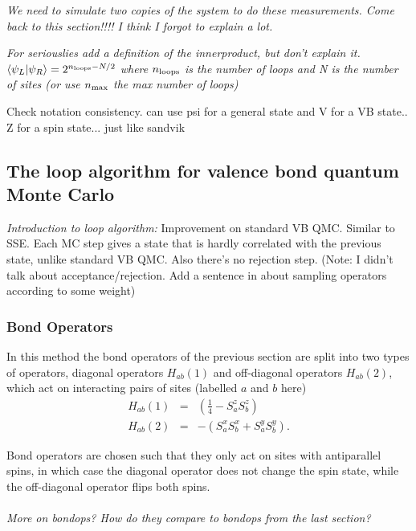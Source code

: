 \documentclass[prb,aps,twocolumn,floatfix,amsmath,amssymb,superscriptaddress,tightenlines]{revtex4}
\begin{document}
{\it We need to simulate two copies of the system to do these measurements.  
Come back to this section!!!!  I think I forgot to explain a lot. }

{\it For seriouslies add a definition of the innerproduct, but don't explain it.  
$\langle \psi_L \rvert \psi_R \rangle = 2^{n_{\rm loops} - N/2}$ where $n_{\rm loops}$ is the number
of loops and N is the number of sites  (or use $n_{\rm max}$ the max number of loops)

Check notation consistency.  can use psi for a general state and V for a VB state.. Z for a spin state... just like sandvik
}

\subsection{The loop algorithm for valence bond quantum Monte Carlo}

{\it Introduction to loop algorithm:}
Improvement on standard VB QMC.  Similar to SSE.  Each MC step gives a state that is hardly correlated with the previous state, unlike standard VB QMC.  Also there's no rejection step.  (Note: I didn't talk about acceptance/rejection.  Add a sentence in about sampling operators according to some weight)

\subsubsection{Bond Operators}

In this method the bond operators of the previous section are split into two types of  operators, diagonal operators $H_{ab}(1)$ and off-diagonal operators $H_{ab}(2)$, which act on interacting pairs of sites (labelled $a$ and $b$ here)
\begin{eqnarray}
	H_{ab}(1) &=&(\tfrac{1}{4} - S^z_aS^z_b) \\
	H_{ab}(2) &=& -(S_a^xS_b^x + S_a^yS_b^y). 
\end{eqnarray}

Bond operators are chosen such that they only act on sites with antiparallel spins, in which case the diagonal operator does not change the spin state, while the off-diagonal operator  flips both spins.
\\\\{\it More on bondops? How do they compare to bondops from the last section?}
\\
\end{document}
